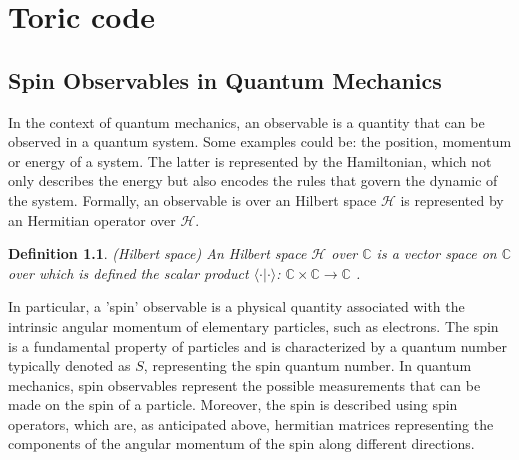 \documentclass{Configuration_Files/PoliMi3i_thesis}
\newtheorem{definition}{Definition}[chapter]
\begin{document}
\chapter{Toric code}
\label{ch:chapter_one}%


\section{Spin Observables in Quantum Mechanics}
\label{sec:Observables}

In the context of quantum mechanics, an observable is a quantity that can be observed in a quantum system. Some examples could be: the position, momentum or energy of a system. The latter is represented by the Hamiltonian, which not only describes the energy but also encodes the rules that govern the dynamic of the system. 
Formally, an observable is over an Hilbert space $\mathscr{H}$ is represented by an Hermitian operator over $\mathscr{H}$.

\begin{definition} (Hilbert space)
	An Hilbert space $\mathscr{H}$ over $\mathbb{C}$ is a vector space on $\mathbb{C}$ over which is defined the scalar product $\langle \cdot \vert \cdot \rangle $: $\mathbb{C} \times \mathbb{C} \rightarrow \mathbb{C}$ .
\end{definition}

In particular, a 'spin' observable is a physical quantity associated with the intrinsic angular momentum of elementary particles, such as electrons. The spin is a fundamental property of particles and is characterized by a quantum number typically denoted as $S$, representing the spin quantum number.
In quantum mechanics, spin observables represent the possible measurements that can be made on the spin of a particle. Moreover, the spin is described using spin operators, which are, as anticipated above, hermitian matrices representing the components of the angular momentum of the spin along different directions. 
\end{document}
